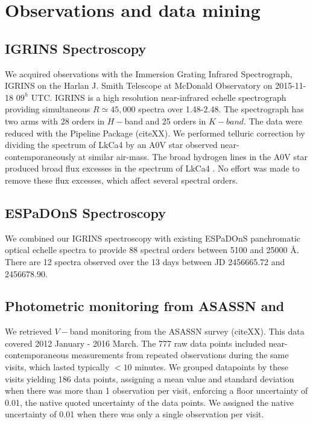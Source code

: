 \documentclass[onecolumn]{emulateapj}%
\newcommand{\name}{LkCa4 }
\begin{document}
\section{Observations and data mining}\label{sec:obs} 

\subsection{IGRINS Spectroscopy}\label{sec:igrins} 
We acquired observations with the Immersion Grating Infrared Spectrograph, IGRINS \citep{2014SPIE.9147E..1DP,2012SPIE.8450E..2SG} on the Harlan J. Smith Telescope at McDonald Observatory on 2015-11-18 $09^h$ UTC.  IGRINS is a high resolution near-infrared echelle spectrograph providing simultaneous $R\simeq45,000$ spectra over 1.48-2.48\um.  The spectrograph has two arms with 28 orders in $H-$band and 25 orders in $K-band$.  The data were reduced with the Pipeline Package (citeXX).  We performed telluric correction by dividing the spectrum of \name by an A0V star observed near-contemporaneously at similar air-mass.  The broad hydrogen lines in the A0V star produced broad flux excesses in the spectrum of \name.  No effort was made to remove these flux excesses, which affect several spectral orders. 

\subsection{ESPaDOnS Spectroscopy}
We combined our IGRINS spectroscopy with existing ESPaDOnS panchromatic optical echelle spectra to provide 88 spectral orders between 5100 and 25000 \AA \citep{2014MNRAS.444.3220D}.  There are 12 spectra observed over the 13 days between JD 2456665.72 and 2456678.90.  

\subsection{Photometric monitoring from ASASSN and \citet{grankin08}}

We retrieved $V-$band monitoring from the ASASSN survey (citeXX).  This data covered 2012 January - 2016 March.  The 777 raw data points included near-contemporaneous measurements from repeated observations during the same visits, which lasted typically $<10$ minutes.  We grouped datapoints by these visits yielding 186 data points, assigning a mean value and standard deviation when there was more than 1 observation per visit, enforcing a floor uncertainty of 0.01, the native quoted uncertainty of the data points.  We assigned the native uncertainty of 0.01 when there was only a single observation per visit.
\end{document}

